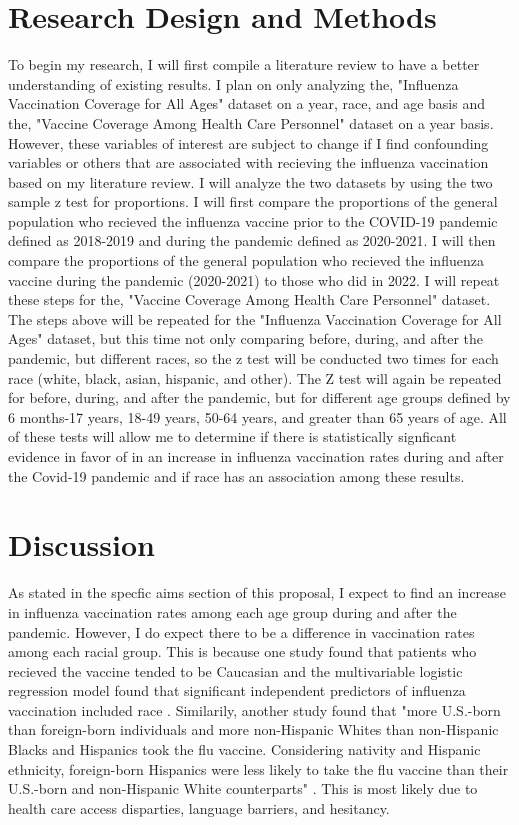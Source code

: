 \documentclass[12pt]{article}
\begin{document}
\section{Research Design and Methods}
\label{sec:design}
To begin my research, I will first compile a literature review to have a better understanding of existing results. I plan on only analyzing the, 
"Influenza Vaccination Coverage for All Ages" dataset on a year, race, and age basis and the, "Vaccine Coverage Among Health Care Personnel" 
dataset on a year basis. However, these variables of interest are subject to change if I find confounding variables or others that
are associated with recieving the influenza vaccination based on my literature review. I will analyze the two datasets by using the two sample z 
test for proportions. I will first compare the proportions of the general population who recieved the influenza vaccine prior to the COVID-19 
pandemic defined as 2018-2019 and during the pandemic defined as 2020-2021. I will then compare the proportions of the general population who
recieved the influenza vaccine during the pandemic (2020-2021) to those who did in 2022. I will repeat these steps for the, "Vaccine Coverage Among 
Health Care Personnel" dataset. The steps above will be repeated for the "Influenza Vaccination Coverage for All Ages" dataset, but this time not only
comparing before, during, and after the pandemic, but different races, so the z test will be conducted two times for each race (white, black, asian,
hispanic, and other). The Z test will again be repeated for before, during, and after the pandemic, but for different age groups defined by 6 months-17 years, 
18-49 years, 50-64 years, and greater than 65 years of age. All of these tests will allow me to determine if there is statistically signficant evidence in favor
of in an increase in influenza vaccination rates during and after the Covid-19 pandemic and if race has an association among these results.

\section{Discussion}
\label{sec:discussion}
As stated in the specfic aims section of this proposal, I expect to find an increase in influenza vaccination rates among each age group during and after the 
pandemic. However, I do expect there to be a difference in vaccination rates among each racial group. This is because one study found that patients who recieved 
the vaccine tended to be Caucasian and  the multivariable logistic regression model found that significant independent predictors
of influenza vaccination included race \citep{conlon2021impact}. Similarily, another study found that "more U.S.-born than foreign-born individuals and more 
non-Hispanic Whites than non-Hispanic Blacks and Hispanics took the flu vaccine. Considering nativity and Hispanic ethnicity, foreign-born Hispanics were less 
likely to take the flu vaccine than their U.S.-born and non-Hispanic White counterparts" \citep{jang2021factors}. This is most likely due to health care access 
disparties, language barriers, and hesitancy. 
\end{document}
